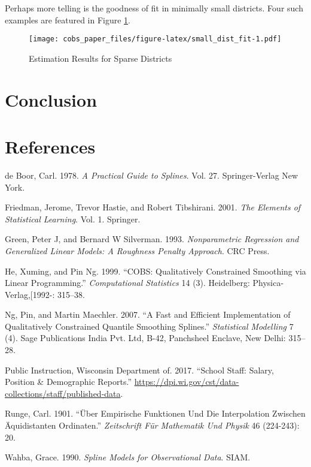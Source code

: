 \documentclass[]{article}
\begin{document}
Perhaps more telling is the goodness of fit in minimally small
districts. Four such examples are featured in Figure
\ref{fig:small_fit}.

\begin{figure}[htbp]
\centering
\texttt{[image: cobs\_paper\_files/figure-latex/small\_dist\_fit-1.pdf]}
\caption{\label{fig:small_fit}Estimation Results for Sparse Districts}
\end{figure}

\section{Conclusion}\label{conclusion}

\section{References}\label{references}



\hypertarget{refs}{}
\hypertarget{ref-deboor}{}
de Boor, Carl. 1978. \emph{A Practical Guide to Splines}. Vol. 27.
Springer-Verlag New York.

\hypertarget{ref-friedman}{}
Friedman, Jerome, Trevor Hastie, and Robert Tibshirani. 2001. \emph{The
Elements of Statistical Learning}. Vol. 1. Springer.

\hypertarget{ref-green}{}
Green, Peter J, and Bernard W Silverman. 1993. \emph{Nonparametric
Regression and Generalized Linear Models: A Roughness Penalty Approach}.
CRC Press.

\hypertarget{ref-he}{}
He, Xuming, and Pin Ng. 1999. ``COBS: Qualitatively Constrained
Smoothing via Linear Programming.'' \emph{Computational Statistics} 14
(3). Heidelberg: Physica-Verlag,{[}1992-: 315--38.

\hypertarget{ref-ng}{}
Ng, Pin, and Martin Maechler. 2007. ``A Fast and Efficient
Implementation of Qualitatively Constrained Quantile Smoothing
Splines.'' \emph{Statistical Modelling} 7 (4). Sage Publications India
Pvt. Ltd, B-42, Panchsheel Enclave, New Delhi: 315--28.

\hypertarget{ref-dpi}{}
Public Instruction, Wisconsin Department of. 2017. ``School Staff:
Salary, Position \& Demographic Reports.''
\url{https://dpi.wi.gov/cst/data-collections/staff/published-data}.

\hypertarget{ref-runge}{}
Runge, Carl. 1901. ``Über Empirische Funktionen Und Die Interpolation
Zwischen Äquidistanten Ordinaten.'' \emph{Zeitschrift Für Mathematik Und
Physik} 46 (224-243): 20.

\hypertarget{ref-wahba}{}
Wahba, Grace. 1990. \emph{Spline Models for Observational Data}. SIAM.
\end{document}
